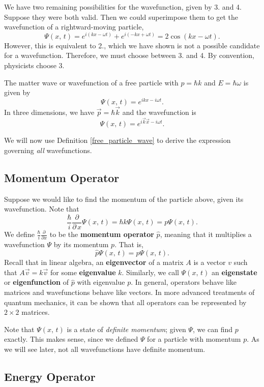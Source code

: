 We have two remaining possibilities for the wavefunction, given by 3. and 4. Suppose they were both valid. Then we could superimpose them to get the wavefunction of a rightward-moving particle, $$\Psi(x,\,t)=e^{i(kx-\omega t)}+e^{i(-kx+\omega t)}=2\cos(kx-\omega t).$$However, this is equivalent to 2., which we have shown is not a possible candidate for a wavefunction. Therefore, we must choose between 3. and 4. By convention, physicists choose 3.

\begin{frameddefn}\label{free_particle_wave}
    The matter wave or wavefunction of a free particle with $p=\hbar k$ and $E=\hbar\omega$ is given by $$\Psi(x,\,t)=e^{ikx-i\omega t}.$$In three dimensions, we have $\vec{p}=\hbar\vec{k}$ and the wavefunction is $$\Psi(x,\,t)=e^{i\vec{k}\vec{x}-i\omega t}.$$
\end{frameddefn}

We will now use Definition \ref{free_particle_wave} to derive the expression governing \textit{all} wavefunctions.

\subsection{Momentum Operator}\label{p_operator}

Suppose we would like to find the momentum of the particle above, given its wavefunction. Note that $$\frac{\hbar}{i}\frac{\partial}{\partial\,x}\Psi(x,\,t)=\hbar k\Psi(x,\,t)=p\Psi(x,\,t).$$We define $\frac{\hbar}{i}\frac{\partial}{\partial x}$ to be the \textbf{momentum operator} $\hat{p}$, meaning that it multiplies a wavefunction $\Psi$ by its momentum $p$. That is, $$\hat{p}\Psi(x,\,t)=p\Psi(x,\,t).$$ Recall that in linear algebra, an \textbf{eigenvector} of a matrix $A$ is a vector $v$ such that $A\vec{v}=k\vec{v}$ for some \textbf{eigenvalue} $k$. Similarly, we call $\Psi(x,\,t)$ an \textbf{eigenstate} or \textbf{eigenfunction} of $\hat{p}$ with eigenvalue $p$. In general, operators behave like matrices and wavefunctions behave like vectors. In more advanced treatments of quantum mechanics, it can be shown that all operators can be represented by $2\times 2$ matrices.

Note that $\Psi(x,\,t)$ is a state of \textit{definite momentum}; given $\Psi$, we can find $p$ exactly. This makes sense, since we defined $\Psi$ for a particle with momentum $p$. As we will see later, not all wavefunctions have definite momentum.

\subsection{Energy Operator}\label{e_operator}

